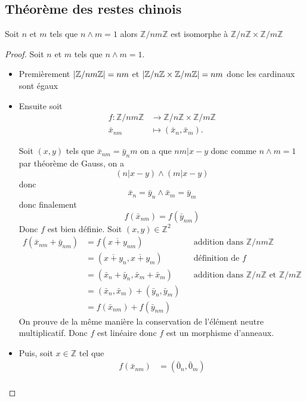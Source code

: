 \documentclass[11pt,colorlinks]{book}
\theoremstyle{mytheoremstyle}
\theoremstyle{mytheoremstyle}
\theoremstyle{mytheoremstyle}
\theoremstyle{mytheoremstyle}
\theoremstyle{mytheoremstyle}
\theoremstyle{mytheoremstyle}
\theoremstyle{mytheoremstyle}
\theoremstyle{mytheoremstyle}
\theoremstyle{myproblemstyle}
\def\mbb#1{\mathbb{#1}}
\def\bZ{\mbb{Z}}
\newcommand{\vfunc}[5]{
  \begin{align*}
    #1 \colon #2 &\to #3\\
    #4 &\mapsto #5.
  \end{align*}
}
\begin{document}
\subsection{Théorème des restes chinois}
\begin{theorem}
  Soit $n$ et $m$ tels que $n \wedge m = 1$ alors $\bZ/nm\bZ$ est isomorphe à $\bZ/n\bZ \times \bZ/m\bZ$
  \begin{proof}
    Soit $n$ et $m$ tels que $n \wedge m = 1$.
    \begin{itemize}
      \item Premièrement $\abs{\bZ/nm\bZ} = nm$ et $\abs{\bZ/n\bZ \times \bZ/m\bZ} = nm$ donc les cardinaux sont égaux
      \item Ensuite soit \vfunc{f}{\bZ/nm\bZ}{\bZ/n\bZ\times \bZ/m\bZ}{\bar{x}_{nm}}{(\bar{x}_n,\bar{x}_m)}
      Soit $(x,y)$ tels que $\bar{x}_{nm} = \bar{y}_nm$ on a que $nm | x - y$ donc comme $n \wedge m = 1$ par théorème de Gauss, 
      on a 
      \begin{equation*}
        (n | x - y) \wedge (m | x - y)
      \end{equation*}
      donc 
      \begin{equation*}
        \bar{x}_{n} = \bar{y}_{n} \wedge \bar{x}_m = \bar{y}_m
      \end{equation*}
      donc finalement 
      \begin{equation*}
        f(\bar{x}_{nm}) = f(\bar{y}_{nm})
      \end{equation*}
      Donc $f$ est bien définie. Soit $(x,y) \in \bZ^2$ 
      \begin{align*}
        f(\bar{x}_{nm} + \bar{y}_{nm}) &= f(\overline{x+y}_{nm}) && \text{addition dans } \bZ/nm\bZ \\ 
        &= (\overline{x+y}_n,\overline{x+y}_m) && \text{définition de } f \\ 
        &= (\bar{x}_n + \bar{y}_n,\bar{x}_m + \bar{x}_m) && \text{addition dans } \bZ/n\bZ \text{ et } \bZ/m\bZ \\ 
        &= (\bar{x}_n,\bar{x}_m) + (\bar{y}_n,\bar{y}_m) \\ 
        &= f(\bar{x}_{nm}) + f(\bar{y}_{nm}) 
      \end{align*}
      On prouve de la même manière la conservation de l'élément neutre multiplicatif.
      Donc $f$ est linéaire donc $f$ est un morphisme d'anneaux.
      \item Puis, soit $x \in \bZ$ tel que 
      \begin{align*}
        f(\bar{x}_{nm}) &= (\bar{0}_n,\bar{0}_m) \\

\end{align*}
\end{itemize}
\end{proof}
\end{theorem}
\end{document}
